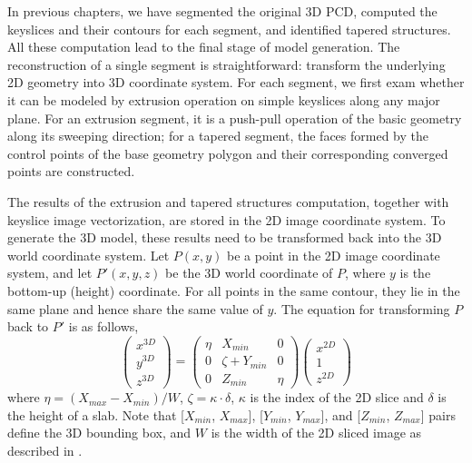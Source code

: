 
In previous chapters, we have segmented the original 3D PCD,
computed the keyslices and their contours for each segment,
and identified tapered structures.
All these computation lead to the final stage of model generation.
The reconstruction of a single segment is straightforward:
transform the underlying 2D geometry into 3D coordinate system.
For each segment, we first exam whether it can be modeled
by extrusion operation on simple keyslices along any major plane.
For an extrusion segment, it is a push-pull operation
of the basic geometry along its sweeping direction;
for a tapered segment, the faces formed by the control points
of the base geometry polygon and their corresponding converged points
are constructed.

The results of the extrusion and tapered structures computation,
together with keyslice image vectorization,
are stored in the 2D image coordinate system.
To generate the 3D model, these results need to be transformed
back into the 3D world coordinate system.
Let $P(x,y)$ be a point in the 2D image coordinate system,
and let $P'(x,y,z)$ be the 3D world coordinate of $P$,
where $y$ is the bottom-up (height) coordinate.
For all points in the same contour,
they lie in the same plane and hence share the same value of $y$.
The equation for transforming $P$ back to $P'$ is as follows,
\begin{equation}
\left(
\begin{array}{c}
x^{3D} \\
y^{3D} \\
z^{3D}
\end{array}
\right) =
\left(
\begin{array}{ccc}
\eta & X_{min} & 0 \\
0 & \zeta + Y_{min} & 0 \\
0 & Z_{min} & \eta
\end{array}
\right)
\left(
\begin{array}{c}
x^{2D} \\
1 \\
z^{2D}
\end{array}
\right)
\label{eq:ir2dxf}
\end{equation}
where $\eta=(X_{max} - X_{min})/W$,  $\zeta=\kappa\cdot\delta$,
$\kappa$ is the index of the 2D slice
and $\delta$ is the height of a slab.
Note that [$X_{min}$, $X_{max}$], [$Y_{min}$, $Y_{max}$],
and [$Z_{min}$, $Z_{max}$] pairs define the 3D bounding box,
and $W$ is the width of the 2D sliced image
as described in .


